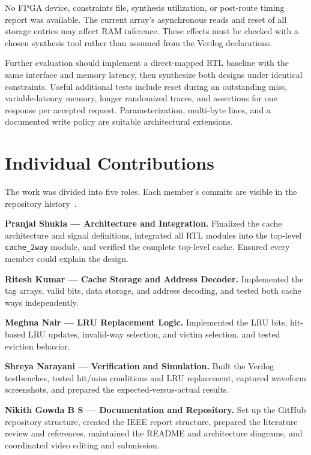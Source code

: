 \documentclass[conference]{IEEEtran}
\begin{document}
No FPGA device, constraints file, synthesis utilization, or post-route
timing report was available. The current array's asynchronous reads and
reset of all storage entries may affect RAM inference. These effects
must be checked with a chosen synthesis tool rather than assumed from
the Verilog declarations.

Further evaluation should implement a direct-mapped RTL baseline with
the same interface and memory latency, then synthesize both designs
under identical constraints. Useful additional tests include reset
during an outstanding miss, variable-latency memory, longer randomized
traces, and assertions for one response per accepted request.
Parameterization, multi-byte lines, and a documented write policy are
suitable architectural extensions.

\section{Individual Contributions}

The work was divided into five roles. Each member's commits are visible
in the repository history~\cite{repo}.

\textbf{Pranjal Shukla --- Architecture and Integration.} Finalized the
cache architecture and signal definitions, integrated all RTL modules
into the top-level \texttt{cache\_2way} module, and verified the
complete top-level cache. Ensured every member could explain the design.

\textbf{Ritesh Kumar --- Cache Storage and Address Decoder.} Implemented
the tag arrays, valid bits, data storage, and address decoding, and
tested both cache ways independently.

\textbf{Meghna Nair --- LRU Replacement Logic.} Implemented the LRU
bits, hit-based LRU updates, invalid-way selection, and victim
selection, and tested eviction behavior.

\textbf{Shreya Narayani --- Verification and Simulation.} Built the
Verilog testbenches, tested hit/miss conditions and LRU replacement,
captured waveform screenshots, and prepared the expected-versus-actual
results.

\textbf{Nikith Gowda B S --- Documentation and Repository.} Set up the
GitHub repository structure, created the IEEE report structure,
prepared the literature review and references, maintained the README
and architecture diagrams, and coordinated video editing and
submission.
\end{document}
